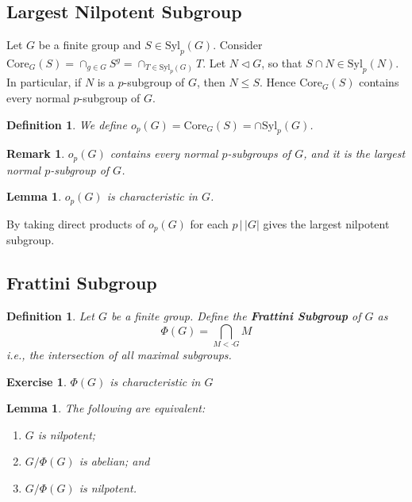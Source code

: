 \documentclass[a4paper,10pt]{article}
\newtheorem{Def}[thm]{Definition}
\newtheorem{Ex}[thm]{Exercise}
\newtheorem{Lem}[thm]{Lemma}
\newtheorem{rem}[thm]{Remark}
\begin{document}
\subsection{Largest Nilpotent Subgroup}

Let $G$ be a finite group and $S \in \text{Syl}_p(G)$. Consider $\text{Core}_G(S) = \cap_{g \in G} S^g = \cap_{T \in \text{Syl}_p(G)} T$. Let $N \triangleleft G$, so that $S \cap N \in \text{Syl}_p(N)$. In particular, if $N$ is a $p$-subgroup of $G$, then $N \leq S$. Hence $\text{Core}_G(S)$ contains every normal $p$-subgroup of $G$. 

\begin{Def}
We define $o_p(G) = \text{Core}_G(S) = \cap \text{Syl}_p(G)$. 
\end{Def}

\begin{rem}
$o_p(G)$ contains every normal $p$-subgroups of $G$, and it is the largest normal $p$-subgroup of $G$. 
\end{rem}

\begin{Lem}
$o_p(G)$ is characteristic in $G$.
\end{Lem}

By taking direct products of $o_p(G)$ for each $p \, \big| \, |G|$ gives the largest nilpotent subgroup.

\subsection{Frattini Subgroup}

\begin{Def}
Let $G$ be a finite group. Define the \textbf{Frattini Subgroup} of $G$ as
\[ \Phi(G) = \bigcap_{M < \cdot G} M \]
i.e., the intersection of all maximal subgroups.
\end{Def}

\begin{Ex}
$\Phi(G)$ is characteristic in $G$
\end{Ex}

\begin{Lem}
The following are equivalent:
\begin{enumerate}
\item $G$ is nilpotent;
\item $G / \Phi(G)$ is abelian; and
\item $G / \Phi(G)$ is nilpotent.
\end{enumerate}
\end{Lem}
\end{document}
